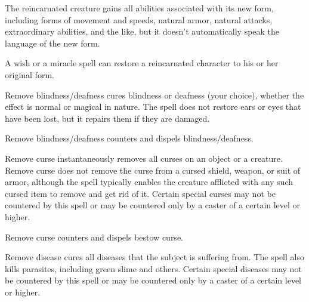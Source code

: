 \begin{multicols}{2}
\begin{small}
\smallskip\noindent The reincarnated creature gains all abilities associated with its new form, including forms of movement and speeds, natural armor, natural attacks, extraordinary abilities, and the like, but it doesn't automatically speak the language of the new form. 

\smallskip\noindent A wish or a miracle spell can restore a reincarnated character to his or her original form.


\noindent Remove blindness/deafness cures blindness or deafness (your choice), whether the effect is normal or magical in nature. The spell does not restore ears or eyes that have been lost, but it repairs them if they are damaged.

\smallskip\noindent Remove blindness/deafness counters and dispels blindness/deafness.

\noindent Remove curse instantaneously removes all curses on an object or a creature. Remove curse does not remove the curse from a cursed shield, weapon, or suit of armor, although the spell typically enables the creature afflicted with any such cursed item to remove and get rid of it. Certain special curses may not be countered by this spell or may be countered only by a caster of a certain level or higher.

\smallskip\noindent Remove curse counters and dispels bestow curse.

\noindent Remove disease cures all diseases that the subject is suffering from. The spell also kills parasites, including green slime and others. Certain special diseases may not be countered by this spell or may be countered only by a caster of a certain level or higher.


\end{small}
\end{multicols}
